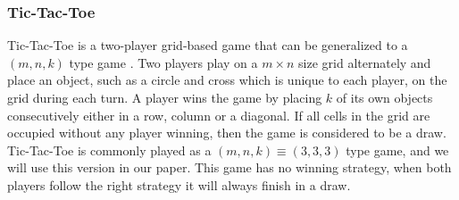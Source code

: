 
\subsubsection{Tic-Tac-Toe}

Tic-Tac-Toe is a two-player grid-based game that can be generalized to a $(m,n,k)$ type game \citep{abu2019tic}. Two players play on a $m\times n$  size grid alternately and place an object, such as a circle and cross which is unique to each player, on the grid during each turn. A player wins the game by placing $k$ of its own objects consecutively either in a row, column or a diagonal. If all cells in the grid are occupied without any player winning, then the game is considered to be a draw. Tic-Tac-Toe is commonly played as a $(m,n,k) \equiv (3,3,3)$ type game, and we will use this version in our paper. This game has no winning strategy, when both players follow the right strategy it will always finish in a draw.


